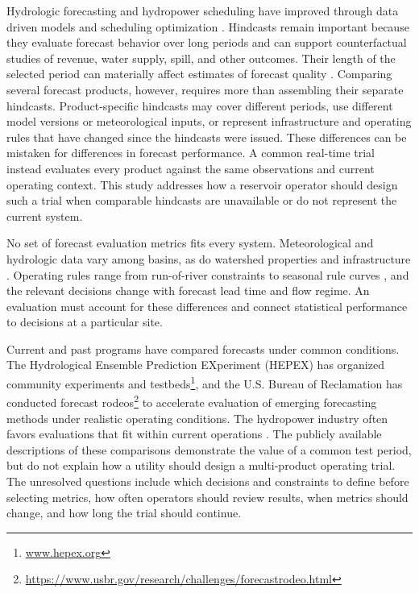 \documentclass[MLA]{USG} %
\begin{document}

Hydrologic forecasting and hydropower scheduling have improved through data driven models \citep{kratzertLearningUniversalRegional2019a} and scheduling optimization \citep{zhangOptimizationShorttermHydropower2024}. Hindcasts remain important because they evaluate forecast behavior over long periods and can support counterfactual studies of revenue, water supply, spill, and other outcomes. Their length of the selected period can materially affect estimates of forecast quality \citep{randrianasoloImpactStreamflowData2014}.
Comparing several forecast products, however, requires more than assembling their separate hindcasts. Product-specific hindcasts may cover different periods, use different model versions or meteorological inputs, or represent infrastructure and operating rules that have changed since the hindcasts were issued. These differences can be mistaken for differences in forecast performance. A common real-time trial instead evaluates every product against the same observations and current operating context. This study addresses how a reservoir operator should design such a trial when comparable hindcasts are unavailable or do not represent the current system.

No set of forecast evaluation metrics fits every system. Meteorological and hydrologic data vary among basins, as do watershed properties and infrastructure \citep{phamEvaluationRandomForests2021}. Operating rules range from run-of-river constraints to seasonal rule curves \citep{zajacImpactLakeReservoir2017}, and the relevant decisions change with forecast lead time and flow regime. An evaluation must account for these differences and connect statistical performance to decisions at a particular site.

Current and past programs have compared forecasts under common conditions. The Hydrological Ensemble Prediction EXperiment (HEPEX) has organized community experiments and testbeds\footnote{\url{www.hepex.org}}, and the U.S. Bureau of Reclamation has conducted forecast rodeos\footnote{\url{https://www.usbr.gov/research/challenges/forecastrodeo.html}} to accelerate evaluation of emerging forecasting methods under realistic operating conditions. The hydropower industry often favors evaluations that fit within current operations \citep{krajewskiRealtimeStreamflowForecasting2021}. The publicly available descriptions of these comparisons demonstrate the value of a common test period, but do not explain how a utility should design a multi-product operating trial. The unresolved questions include which decisions and constraints to define before selecting metrics, how often operators should review results, when metrics should change, and how long the trial should continue.
\end{document}
